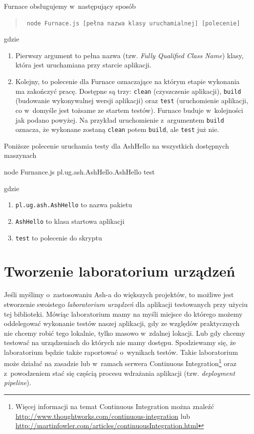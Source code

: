 \documentclass[brudnopis]{xmgr}
\begin{document}
Furnace obsługujemy w~następujący sposób

\begin{quote}
	\texttt{ node Furnace.js [pełna nazwa klasy uruchamialnej] [polecenie] }
\end{quote}

gdzie

\begin{enumerate}
  \item Pierwszy argument to pełna nazwa (tzw. \textit{Fully Qualified Class Name}) klasy, która jest uruchamiana przy starcie aplikacji. 
  \item Kolejny, to polecenie dla Furnace oznaczające na którym etapie wykonania ma zakończyć pracę. Dostępne są trzy: \texttt{clean} (czyszczenie aplikacji), \texttt{build} (budowanie wykonywalnej wersji aplikacji) oraz \texttt{test} (uruchomienie aplikacji, co w~domyśle jest tożsame ze startem testów). Furnace buduje w~kolejności jak podano powyżej. Na przykład uruchomienie z~argumentem \texttt{build} oznacza, że wykonane zostaną \texttt{clean} potem \texttt{build}, ale \texttt{test} już nie.
\end{enumerate}

Poniższe polecenie uruchamia testy dla AshHello na wszystkich dostępnych maszynach 

\begin{javascriptcode}
	node Furnance.js pl.ug.ash.AshHello.AshHello test
\end{javascriptcode}

gdzie

\begin{enumerate}
  \item \texttt{pl.ug.ash.AshHello} to nazwa pakietu
  \item \texttt{AshHello} to klasa startowa aplikacji
  \item \texttt{test} to polecenie do skryptu 
\end{enumerate}

\section{Tworzenie laboratorium urządzeń}

Jeśli myślimy o~zastosowaniu Ash-a do większych projektów, to możliwe jest stworzenie swoistego \textit{laboratorium urządzeń} dla aplikacji testowanych przy użyciu tej biblioteki. Mówiąc laboratorium mamy na myśli miejsce do którego możemy oddelegować wykonanie testów naszej aplikacji, gdy ze względów praktycznych nie chcemy robić tego lokalnie, tylko masowo w~zdalnej lokacji. Lub gdy chcemy testować na urządzeniach do których nie mamy dostępu. Spodziewamy się, że laboratorium będzie także raportować o~wynikach testów. Takie laboratorium może działać na zasadzie lub w~ramach serwera Continuous Integration\footnote{ Więcej informacji na temat Continuous Integration można znaleźć \url{http://www.thoughtworks.com/continuous-integration} lub \url{http://martinfowler.com/articles/continuousIntegration.html} } oraz z~powodzeniem stać się częścią procesu wdrażania aplikacji (tzw. \textit{deployment pipeline}).
\end{document}
